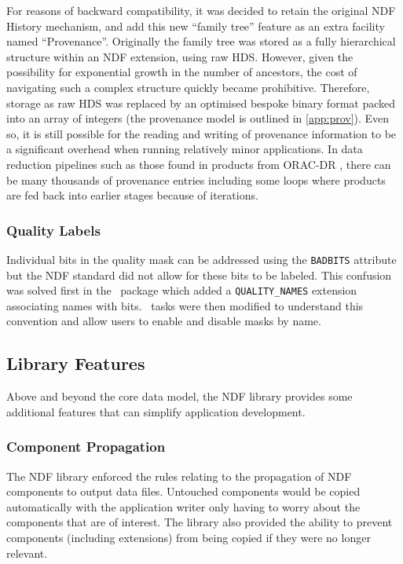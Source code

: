 \documentclass[final,authoryear,5p,times,twocolumn]{elsarticle}
\begin{document}
For reasons of backward compatibility, it was decided to retain the
original NDF History mechanism, and add this new ``family tree''
feature as an extra facility named ``Provenance''.  Originally the
family tree was stored as a fully hierarchical structure within an NDF
extension, using raw HDS. However, given the possibility for
exponential growth in the number of ancestors, the cost of navigating
such a complex structure quickly became prohibitive. Therefore,
storage as raw HDS was replaced by an optimised bespoke binary format
packed into an array of integers (the provenance model is outlined in
\ref{app:prov}). Even so, it is still possible for
the reading and writing of provenance information to be a significant
overhead when running relatively minor applications.  In data
reduction pipelines such as those found in products from ORAC-DR
\citep{2008AN....329..295C}, there can be many thousands of provenance
entries including some loops where products are fed back into earlier
stages because of iterations.

\subsubsection{Quality Labels}

Individual bits in the quality mask can be addressed using the
\texttt{BADBITS} attribute but the NDF standard did not allow for
these bits to be labeled. This confusion was solved first in the
\iras\ package which added a \texttt{QUALITY\_NAMES}
extension associating names with bits. \KAPPA\ tasks were then
modified to understand this convention and allow users to enable and
disable masks by name.

\subsection{Library Features}

Above and beyond the core data model, the NDF library provides some
additional features that can simplify application development.

\subsubsection{Component Propagation}

The NDF library enforced the rules relating to the propagation of
NDF components to output data files. Untouched components would be
copied automatically with the application writer only having to worry
about the components that are of interest. The library also provided
the ability to prevent components (including extensions) from being
copied if they were no longer relevant.
\end{document}
